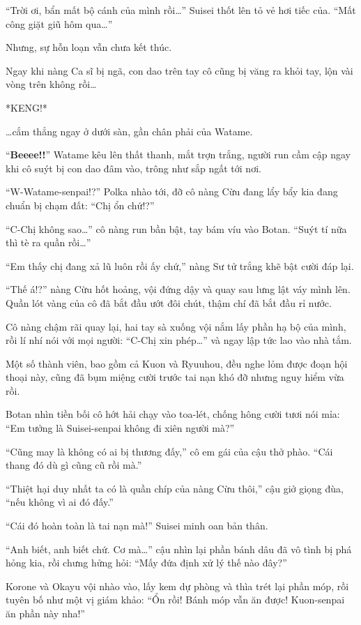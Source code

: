 \documentclass[../main.tex]{subfiles}
\begin{document}
``Trời ơi, bẩn mất bộ cánh của mình rồi\dots'' Suisei thốt lên tỏ vẻ hơi tiếc của. ``Mất công giặt giũ hôm qua\dots''

Nhưng, sự hỗn loạn vẫn chưa kết thúc.

Ngay khi nàng Ca sĩ bị ngã, con dao trên tay cô cũng bị văng ra khỏi tay, lộn vài vòng trên không rồi\dots

*KENG!*

\dots cắm thẳng ngay ở dưới sàn, gần chân phải của Watame.

``\textbf{Beeee!!}'' Watame kêu lên thất thanh, mắt trợn trắng, người run cầm cập ngay khi cô suýt bị con dao đâm vào, trông như sắp ngất tới nơi.

``W-Watame-senpai!?'' Polka nhào tới, đỡ cô nàng Cừu đang lẩy bẩy kia đang chuẩn bị chạm đất: ``Chị ổn chứ!?''

``C-Chị không sao\dots'' cô nàng run bần bật, tay bám víu vào Botan. ``Suýt tí nữa thì tè ra quần rồi\dots''

``Em thấy chị đang xả lũ luôn rồi ấy chứ,'' nàng Sư tử trắng khẽ bật cười đáp lại.

``Thế á!?'' nàng Cừu hốt hoảng, vội đứng dậy và quay sau lưng lật váy mình lên. Quần lót vàng của cô đã bắt đầu ướt đôi chút, thậm chí đã bắt đầu rỉ nước.

Cô nàng chậm rãi quay lại, hai tay sà xuống vội nắm lấy phần hạ bộ của mình, rồi lí nhí nói với mọi người: ``C-Chị xin phép\dots'' và ngay lập tức lao vào nhà tắm.

Một số thành viên, bao gồm cả Kuon và Ryuuhou, đều nghe lỏm được đoạn hội thoại này, cũng đã bụm miệng cười trước tai nạn khó đỡ nhưng nguy hiểm vừa rồi.

Botan nhìn tiền bối cô hớt hải chạy vào toa-lét, chống hông cười tươi nói mỉa: ``Em tưởng là Suisei-senpai không đi xiên người mà?''

``Cũng may là không có ai bị thương đấy,'' cô em gái của cậu thở phào. ``Cái thang đó dù gì cũng cũ rồi mà.''

``Thiệt hại duy nhất ta có là quần chíp của nàng Cừu thôi,'' cậu giở giọng đùa, ``nếu không vì ai đó đấy.''

``Cái đó hoàn toàn là tai nạn mà!'' Suisei minh oan bản thân.

``Anh biết, anh biết chứ. Cơ mà\dots'' cậu nhìn lại phần bánh dâu đã vô tình bị phá hỏng kia, rồi chưng hửng hỏi: ``Mấy đứa định xử lý thế nào đây?''

Korone và Okayu vội nhào vào, lấy kem dự phòng và thìa trét lại phần móp, rồi tuyên bố như một vị giám khảo: ``Ổn rồi! Bánh móp vẫn ăn được! Kuon-senpai ăn phần này nha!''
\end{document}
